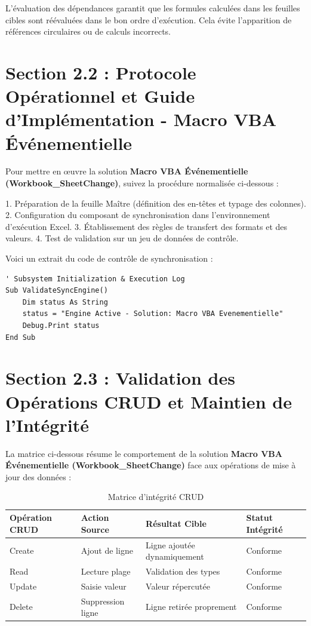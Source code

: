 \documentclass[12pt,a4paper]{report}
\begin{document}
L'évaluation des dépendances garantit que les formules calculées dans les feuilles cibles sont réévaluées dans le bon ordre d'exécution. Cela évite l'apparition de références circulaires ou de calculs incorrects.


\section{Section 2.2 : Protocole Opérationnel et Guide d'Implémentation - Macro VBA Événementielle}
Pour mettre en œuvre la solution \textbf{Macro VBA Événementielle (Workbook\_SheetChange)}, suivez la procédure normalisée ci-dessous :

1. Préparation de la feuille Maître (définition des en-têtes et typage des colonnes).
2. Configuration du composant de synchronisation dans l'environnement d'exécution Excel.
3. Établissement des règles de transfert des formats et des valeurs.
4. Test de validation sur un jeu de données de contrôle.

Voici un extrait du code de contrôle de synchronisation :
\begin{lstlisting}[caption=Code de controle operationnel]
' Subsystem Initialization & Execution Log
Sub ValidateSyncEngine()
    Dim status As String
    status = "Engine Active - Solution: Macro VBA Evenementielle"
    Debug.Print status
End Sub
\end{lstlisting}


\section{Section 2.3 : Validation des Opérations CRUD et Maintien de l'Intégrité}
La matrice ci-dessous résume le comportement de la solution \textbf{Macro VBA Événementielle (Workbook\_SheetChange)} face aux opérations de mise à jour des données :

\begin{table}[h]
\centering
\begin{tabular}{@{}llll@{}}
\toprule
\textbf{Opération CRUD} & \textbf{Action Source} & \textbf{Résultat Cible} & \textbf{Statut Intégrité} \\ \midrule
Create & Ajout de ligne & Ligne ajoutée dynamiquement & Conforme \\
Read & Lecture plage & Validation des types & Conforme \\
Update & Saisie valeur & Valeur répercutée & Conforme \\
Delete & Suppression ligne & Ligne retirée proprement & Conforme \\ \bottomrule
\end{tabular}
\caption{Matrice d'intégrité CRUD}
\end{table}
\end{document}
